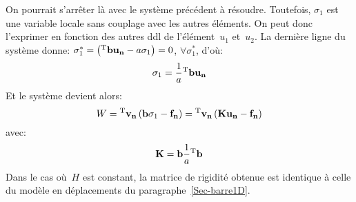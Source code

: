 \medskipvm
On pourrait s'arrêter là avec le système précédent à résoudre.
Toutefois, $\sigma_1$ est une variable locale sans couplage avec les autres éléments.
On peut donc l'exprimer en fonction des autres ddl de l'élément~$u_1$ et~$u_2$.
La dernière ligne du système donne:
$\sigma_1^*=\left(\LL{b}\VV{u_n}-a\sigma_1\right)=0$, $\forall \sigma_1^*$,
d'où:
\begin{equation} \sigma_1 = \frac1a \LL{b}\VV{u_n} \end{equation}
\medskipvm
Et le système devient alors:
\begin{equation} W=\LL{v_n}\left( \VV{b}\sigma_1 -\VV{f_n}\right) =
\LL{v_n} \left( \MM{K}\VV{u_n}-\VV{f_n}\right) \end{equation}
avec:
\begin{equation} \MM{K}=\VV{b}\frac1a\LL{b} \end{equation}
Dans le cas où~$H$ est constant, la matrice de rigidité obtenue est identique à celle du modèle en déplacements du paragraphe~\ref{Sec-barre1D}.